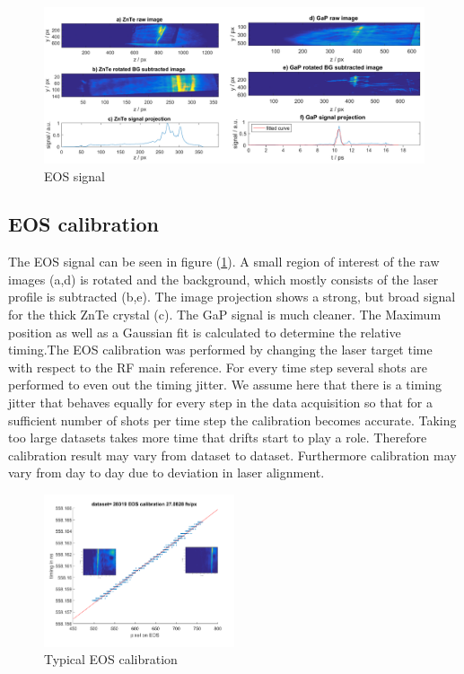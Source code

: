\begin{figure}[htbp]
\includegraphics[width=1.0\textwidth]{experiment/images/edited/EOS_Signal.pdf}
\caption{EOS signal}
\label{img:EOS_Signal}
\end{figure}
\subsection*{EOS calibration}
The EOS signal can be seen in figure (\ref{img:EOS_Signal}). A small region of interest of the raw images (a,d) is rotated and the background, which mostly consists of the laser profile is  subtracted (b,e). The image projection shows a strong, but broad signal for the thick ZnTe crystal (c). The GaP signal is much cleaner. The Maximum position as well as a Gaussian fit is calculated to determine the relative timing.The EOS calibration was performed by changing the laser target time with respect to the RF main reference. For every time step several shots are performed to even out the timing jitter. We assume here that there is a timing jitter that behaves equally for every step in the data acquisition so that for a sufficient number of shots per time step the calibration becomes accurate. Taking too large datasets takes more time that drifts start to play a role. Therefore calibration result may vary from dataset to dataset. Furthermore calibration may vary from day to day due to deviation in laser alignment.
\begin{figure}[htbp]
\center
\includegraphics[width=0.5\textwidth]{experiment/images/edited/20319_EOS_calibration.pdf}
\caption{Typical EOS calibration}
\label{img:EOS_Calib}
\end{figure}

